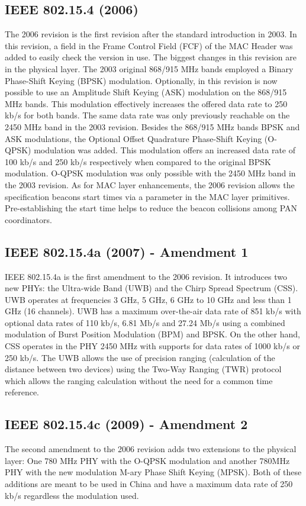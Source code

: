 \documentclass[conference]{IEEEtran}
\begin{document}
\subsection{IEEE 802.15.4 (2006)}\label{wpan2006}
The 2006 revision \cite{std2006} is the first revision after the standard introduction in 2003. In this revision, a field in the Frame Control Field (FCF) of the MAC Header was added to easily check the version in use. The biggest changes in this revision are in the physical layer. The 2003 original 868/915 MHz bands employed a Binary Phase-Shift Keying (BPSK) modulation. Optionally, in this revision is now possible to use an Amplitude Shift Keying (ASK) modulation on the 868/915 MHz bands. This modulation effectively increases the offered data rate to 250 kb/s for both bands. The same data rate was only previously reachable on the 2450 MHz band in the 2003 revision. Besides the 868/915 MHz bands BPSK and ASK modulations, the Optional Offset Quadrature Phase-Shift Keying (O-QPSK) modulation was added. This modulation offers an increased data rate of 100 kb/s and 250 kb/s respectively when compared to the original BPSK modulation. O-QPSK modulation was only possible with the 2450 MHz band in the 2003 revision. As for MAC layer enhancements, the 2006 revision allows the specification beacons start times via a parameter in the MAC layer primitives. Pre-establishing the start time helps to reduce the beacon collisions among PAN coordinators.

\subsection{IEEE 802.15.4a (2007) - Amendment 1}\label{wpan2007}
IEEE 802.15.4a \cite{std2007} is the first amendment to the 2006 revision. It introduces two new PHYs: the Ultra-wide Band (UWB) and the Chirp Spread Spectrum (CSS). UWB operates at frequencies 3 GHz, 5 GHz, 6 GHz to 10 GHz and less than 1 GHz (16 channels). UWB has a maximum over-the-air data rate of 851 kb/s with optional data rates of 110 kb/s, 6.81 Mb/s and 27.24 Mb/s using a combined modulation of Burst Position Modulation (BPM) and BPSK. On the other hand, CSS operates in the PHY 2450 MHz with supports for data rates of 1000 kb/s or 250 kb/s. The UWB allows the use of precision ranging (calculation of  the distance between two devices) using the Two-Way Ranging (TWR) protocol which allows the ranging calculation without the need for a common time reference.

\subsection{IEEE 802.15.4c (2009) - Amendment 2}\label{wpan2009c}
The second amendment\cite{std2009c} to the 2006 revision adds two extensions to the physical layer: One 780 MHz PHY with the O-QPSK modulation and another 780MHz PHY with the new modulation M-ary Phase Shift Keying (MPSK). Both of these additions are meant to be used in China and have a maximum data rate of 250 kb/s regardless the modulation used. 
\end{document}
